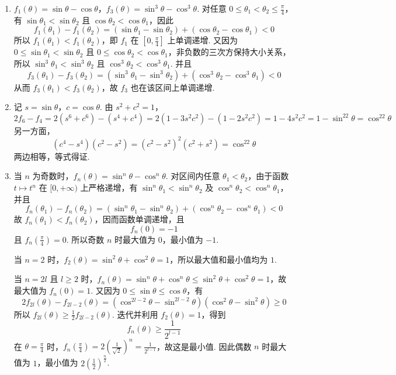 \begin{solution}
\begin{enumerate}
\item \(f_1(\theta)=\sin\theta-\cos\theta\)，\(f_3(\theta)=\sin^3\theta-\cos^3\theta\). 对任意 \(0\leqslant\theta_1<\theta_2\leqslant\frac\pi4\)，有 \(\sin\theta_1<\sin\theta_2\) 且 \(\cos\theta_2<\cos\theta_1\)，因此
\[
f_1(\theta_1)-f_1(\theta_2)=(\sin\theta_1-\sin\theta_2)+(\cos\theta_2-\cos\theta_1)<0
\]
所以 \(f_1(\theta_1)<f_1(\theta_2)\)，即 \(f_1\) 在 \(\left[0,\frac\pi4\right]\) 上单调递增. 又因为 \(0\leqslant\sin\theta_1<\sin\theta_2\) 且 \(0\leqslant\cos\theta_2<\cos\theta_1\)，非负数的三次方保持大小关系，所以 \(\sin^3\theta_1<\sin^3\theta_2\) 且 \(\cos^3\theta_2<\cos^3\theta_1\). 并且
\[
f_3(\theta_1)-f_3(\theta_2)=(\sin^3\theta_1-\sin^3\theta_2)+(\cos^3\theta_2-\cos^3\theta_1)<0
\]
从而 \(f_3(\theta_1)<f_3(\theta_2)\)，故 \(f_3\) 也在该区间上单调递增.
\item 记 \(s=\sin\theta\)，\(c=\cos\theta\). 由 \(s^2+c^2=1\)，
\[
2f_6-f_4=2(s^6+c^6)-(s^4+c^4)=2(1-3s^2c^2)-(1-2s^2c^2)=1-4s^2c^2=1-\sin^22\theta=\cos^22\theta
\]
另一方面，
\[
(c^4-s^4)(c^2-s^2)=(c^2-s^2)^2(c^2+s^2)=\cos^22\theta
\]
两边相等，等式得证.
\item 当 \(n\) 为奇数时，\(f_n(\theta)=\sin^n\theta-\cos^n\theta\). 对区间内任意 \(\theta_1<\theta_2\)，由于函数 \(t\mapsto t^n\) 在 \([0,+\infty)\) 上严格递增，有 \(\sin^n\theta_1<\sin^n\theta_2\) 及 \(\cos^n\theta_2<\cos^n\theta_1\)，并且
\[
f_n(\theta_1)-f_n(\theta_2)=(\sin^n\theta_1-\sin^n\theta_2)+(\cos^n\theta_2-\cos^n\theta_1)<0
\]
故 \(f_n(\theta_1)<f_n(\theta_2)\)，因而函数单调递增，且
\[
f_n(0)=-1
\]
且 \(f_n\left(\frac\pi4\right)=0\).
所以奇数 \(n\) 时最大值为 \(0\)，最小值为 \(-1\).

当 \(n=2\) 时，\(f_2(\theta)=\sin^2\theta+\cos^2\theta=1\)，所以最大值和最小值均为 \(1\).

当 \(n=2l\) 且 \(l\geqslant2\) 时，\(f_n(\theta)=\sin^n\theta+\cos^n\theta\leqslant\sin^2\theta+\cos^2\theta=1\)，故最大值为 \(f_n(0)=1\). 又因为 \(0\leqslant\sin\theta\leqslant\cos\theta\)，有
\[
2f_{2l}(\theta)-f_{2l-2}(\theta)=\left(\cos^{2l-2}\theta-\sin^{2l-2}\theta\right)\left(\cos^2\theta-\sin^2\theta\right)\geqslant0
\]
所以 \(f_{2l}(\theta)\geqslant\frac12f_{2l-2}(\theta)\). 迭代并利用 \(f_2(\theta)=1\)，得到
\[
f_n(\theta)\geqslant\frac{1}{2^{l-1}}
\]
在 \(\theta=\frac\pi4\) 时，\(f_n\left(\frac\pi4\right)=2\left(\frac1{\sqrt2}\right)^n=\frac1{2^{l-1}}\)，故这是最小值. 因此偶数 \(n\) 时最大值为 \(1\)，最小值为 \(2\left(\frac12\right)^{\frac{n}{2}}\).
\end{enumerate}
\end{solution}
